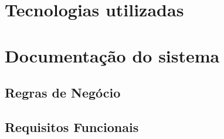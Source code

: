 %
%

\section{Tecnologias utilizadas}

\section{Documentação do sistema}

\subsection{Regras de Negócio}

\subsection{Requisitos Funcionais}

